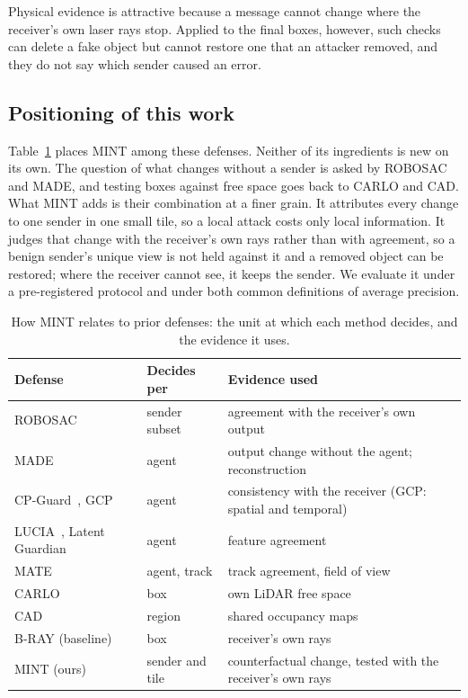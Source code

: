 \documentclass[conference]{IEEEtran}
\newcommand{\mint}{MINT}
\begin{document}
Physical evidence is attractive because a message cannot change where the receiver's own laser rays stop.
Applied to the final boxes, however, such checks can delete a fake object but cannot restore one that an attacker
removed, and they do not say which sender caused an error.

\subsection{Positioning of this work}
Table~\ref{tab:positioning} places \mint{} among these defenses. Neither of its ingredients is new on its own. The
question of what changes without a sender is asked by ROBOSAC and MADE, and testing boxes against free space goes
back to CARLO and CAD. What \mint{} adds is their combination at a finer grain. It attributes every change to one
sender in one small tile, so a local attack costs only local information. It judges that change with the
receiver's own rays rather than with agreement, so a benign sender's unique view is not held against it and a
removed object can be restored; where the receiver cannot see, it keeps the sender. We evaluate it under a
pre-registered protocol and under both common definitions of average precision.

\begin{table}[!t]
\caption{How \mint{} relates to prior defenses: the unit at which each method decides, and the evidence it uses.}
\label{tab:positioning}
\centering
\footnotesize
\setlength{\tabcolsep}{3pt}
\begin{tabular}{@{}>{\raggedright\arraybackslash}p{2.55cm}>{\raggedright\arraybackslash}p{1.45cm}>{\raggedright\arraybackslash}p{3.95cm}@{}}
\toprule
Defense & Decides per & Evidence used\\
\midrule
ROBOSAC~\cite{li2023robosac} & sender subset & agreement with the receiver's own output\\
MADE~\cite{zhao2024made} & agent & output change without the agent; reconstruction\\
CP-Guard~\cite{hu2025cpguard}, GCP~\cite{tao2026gcp} & agent & consistency with the receiver (GCP: spatial and temporal)\\
LUCIA~\cite{wang2025lucia}, Latent Guardian~\cite{zhang2026latentguardian} & agent & feature agreement\\
MATE~\cite{hallyburton2025mate} & agent, track & track agreement, field of view\\
CARLO~\cite{sun2020carlo} & box & own LiDAR free space\\
CAD~\cite{zhang2024cad} & region & shared occupancy maps\\
\midrule
B-RAY (baseline) & box & receiver's own rays\\
\mint{} (ours) & sender and tile & counterfactual change, tested with the receiver's own rays\\
\bottomrule
\end{tabular}
\end{table}
\end{document}
